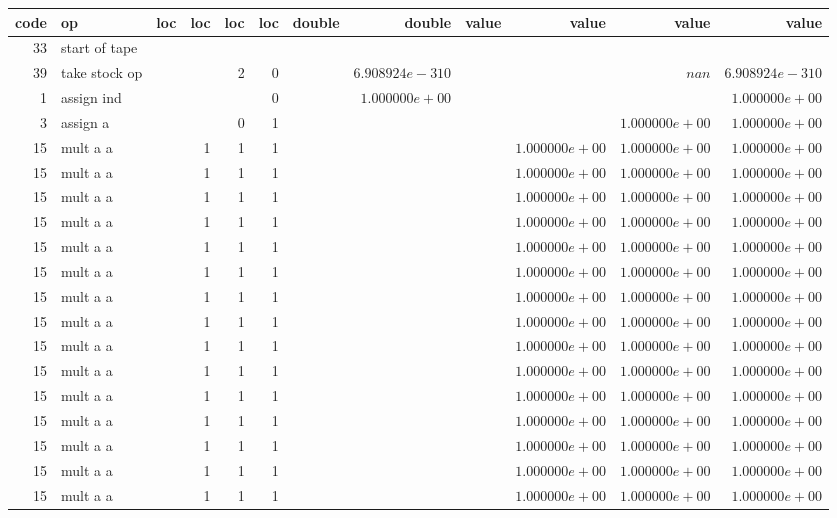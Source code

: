 \documentclass{article}
\begin{document}
\tiny
\begin{tabular}{|r|l|r|r|r|r||r|r||r|r|r|r|} \hline 
 code & op & loc & loc & loc & loc & double & double & value & value & value & value \\ \hline 
 33 & start of tape & & & & & & & & & &  \\ \hline 
39 & take stock op & & & 2 & 0 & &$ 6.908924e-310 $& & &$ nan $&$ 6.908924e-310 $\\ \hline 
1 & assign ind & & & & 0 & &$ 1.000000e+00 $& & & &$ 1.000000e+00 $\\ \hline 
3 & assign a & & & 0 & 1 & & & & &$ 1.000000e+00 $&$ 1.000000e+00 $\\ \hline 
15 & mult a a & & 1 & 1 & 1 & & & &$ 1.000000e+00 $&$ 1.000000e+00 $&$ 1.000000e+00 $\\ \hline 
15 & mult a a & & 1 & 1 & 1 & & & &$ 1.000000e+00 $&$ 1.000000e+00 $&$ 1.000000e+00 $\\ \hline 
15 & mult a a & & 1 & 1 & 1 & & & &$ 1.000000e+00 $&$ 1.000000e+00 $&$ 1.000000e+00 $\\ \hline 
15 & mult a a & & 1 & 1 & 1 & & & &$ 1.000000e+00 $&$ 1.000000e+00 $&$ 1.000000e+00 $\\ \hline 
15 & mult a a & & 1 & 1 & 1 & & & &$ 1.000000e+00 $&$ 1.000000e+00 $&$ 1.000000e+00 $\\ \hline 
15 & mult a a & & 1 & 1 & 1 & & & &$ 1.000000e+00 $&$ 1.000000e+00 $&$ 1.000000e+00 $\\ \hline 
15 & mult a a & & 1 & 1 & 1 & & & &$ 1.000000e+00 $&$ 1.000000e+00 $&$ 1.000000e+00 $\\ \hline 
15 & mult a a & & 1 & 1 & 1 & & & &$ 1.000000e+00 $&$ 1.000000e+00 $&$ 1.000000e+00 $\\ \hline 
15 & mult a a & & 1 & 1 & 1 & & & &$ 1.000000e+00 $&$ 1.000000e+00 $&$ 1.000000e+00 $\\ \hline 
15 & mult a a & & 1 & 1 & 1 & & & &$ 1.000000e+00 $&$ 1.000000e+00 $&$ 1.000000e+00 $\\ \hline 
15 & mult a a & & 1 & 1 & 1 & & & &$ 1.000000e+00 $&$ 1.000000e+00 $&$ 1.000000e+00 $\\ \hline 
15 & mult a a & & 1 & 1 & 1 & & & &$ 1.000000e+00 $&$ 1.000000e+00 $&$ 1.000000e+00 $\\ \hline 
15 & mult a a & & 1 & 1 & 1 & & & &$ 1.000000e+00 $&$ 1.000000e+00 $&$ 1.000000e+00 $\\ \hline 
15 & mult a a & & 1 & 1 & 1 & & & &$ 1.000000e+00 $&$ 1.000000e+00 $&$ 1.000000e+00 $\\ \hline 
15 & mult a a & & 1 & 1 & 1 & & & &$ 1.000000e+00 $&$ 1.000000e+00 $&$ 1.000000e+00 $\\ \hline 

\end{tabular}
\end{document}
